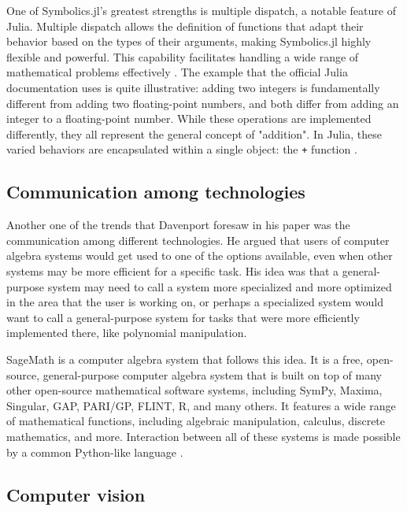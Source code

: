 One of Symbolics.jl's greatest strengths is multiple dispatch, a notable feature of Julia. Multiple dispatch allows the definition of functions that adapt their behavior based on the types of their arguments, making Symbolics.jl highly flexible and powerful. This capability facilitates handling a wide range of mathematical problems effectively \parencite{gowda2021high}. The example that the official Julia documentation uses is quite illustrative: adding two integers is fundamentally different from adding two floating-point numbers, and both differ from adding an integer to a floating-point number. While these operations are implemented differently, they all represent the general concept of "addition". In Julia, these varied behaviors are encapsulated within a single object: the \verb|+| function \parencite{bezanson2017julia}.

\subsection{Communication among technologies}\label{subsec:communication-among-technologies}

Another one of the trends that Davenport \parencite*{davenport1994computer} foresaw in his paper was the communication among different technologies. He argued that users of computer algebra systems would get used to one of the options available, even when other systems may be more efficient for a specific task. His idea was that a general-purpose system may need to call a system more specialized and more optimized in the area that the user is working on, or perhaps a specialized system would want to call a general-purpose system for tasks that were more efficiently implemented there, like polynomial manipulation.

SageMath is a computer algebra system that follows this idea. It is a free, open-source, general-purpose computer algebra system that is built on top of many other open-source mathematical software systems, including SymPy, Maxima, Singular, GAP, PARI/GP, FLINT, R, and many others.  It features a wide range of mathematical functions, including algebraic manipulation, calculus, discrete mathematics, and more. Interaction between all of these systems is made possible by a common Python-like language \parencite{stein2005sage,sagemath}.

\subsection{Computer vision}\label{subsec:computer-vision}

